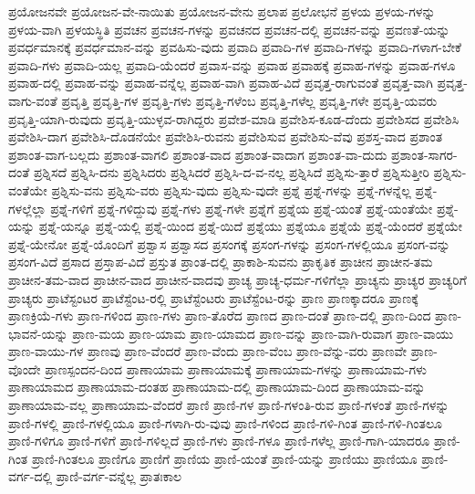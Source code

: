 {ಪ್ರಯೋಜನವೇ
ಪ್ರಯೋಜನ-ವೇ-ನಾಯಿತು
ಪ್ರಯೋಜನ-ವೇನು
ಪ್ರಲಾಪ
ಪ್ರಲೋಭನೆ
ಪ್ರಳಯ
ಪ್ರಳಯ-ಗಳನ್ನು
ಪ್ರಳಯ-ವಾಗಿ
ಪ್ರಳಯಸ್ಥಿತಿ
ಪ್ರವಚನ
ಪ್ರವಚನ-ಗಳನ್ನು
ಪ್ರವಚನದ
ಪ್ರವಚನ-ದಲ್ಲಿ
ಪ್ರವಚನ-ವನ್ನು
ಪ್ರವಣತೆ-ಯನ್ನು
ಪ್ರವರ್ಧಮಾನಕ್ಕೆ
ಪ್ರವರ್ಧಮಾನ-ವನ್ನು
ಪ್ರವಹಿಸು-ವುದು
ಪ್ರವಾದಿ
ಪ್ರವಾದಿ-ಗಳ
ಪ್ರವಾದಿ-ಗಳನ್ನು
ಪ್ರವಾದಿ-ಗಳಾಗ-ಬೇಕೆ
ಪ್ರವಾದಿ-ಗಳು
ಪ್ರವಾದಿ-ಯಲ್ಲ
ಪ್ರವಾದಿ-ಯೆಂದರೆ
ಪ್ರವಾಸ-ವನ್ನು
ಪ್ರವಾಹ
ಪ್ರವಾಹಕ್ಕೆ
ಪ್ರವಾಹ-ಗಳನ್ನು
ಪ್ರವಾಹ-ಗಳೂ
ಪ್ರವಾಹ-ದಲ್ಲಿ
ಪ್ರವಾಹ-ವನ್ನು
ಪ್ರವಾಹ-ವನ್ನೆಲ್ಲ
ಪ್ರವಾಹ-ವಾಗಿ
ಪ್ರವಾಹ-ವಿದೆ
ಪ್ರವೃತ್ತ-ರಾಗುವಂತೆ
ಪ್ರವೃತ್ತ-ವಾಗಿ
ಪ್ರವೃತ್ತ-ವಾಗು-ವಂತೆ
ಪ್ರವೃತ್ತಿ
ಪ್ರವೃತ್ತಿ-ಗಳ
ಪ್ರವೃತ್ತಿ-ಗಳು
ಪ್ರವೃತ್ತಿ-ಗಳೆಂಬ
ಪ್ರವೃತ್ತಿ-ಗಳೆಲ್ಲ
ಪ್ರವೃತ್ತಿ-ಗಳೇ
ಪ್ರವೃತ್ತಿ-ಯವರು
ಪ್ರವೃತ್ತಿ-ಯಾಗಿ-ರುವುದು
ಪ್ರವೃತ್ತಿ-ಯುಳ್ಳವ-ರಾಗಿದ್ದರು
ಪ್ರವೇಶ-ಮಾಡಿ
ಪ್ರವೇಶಿಸ-ಕೂಡ-ದೆಂದು
ಪ್ರವೇಶಿಸದ
ಪ್ರವೇಶಿಸಿ
ಪ್ರವೇಶಿಸಿ-ದಾಗ
ಪ್ರವೇಶಿಸಿ-ದೊಡನೆಯೇ
ಪ್ರವೇಶಿಸಿ-ರುವನು
ಪ್ರವೇಶಿಸುವ
ಪ್ರವೇಶಿಸು-ವೆವು
ಪ್ರಶಸ್ತ-ವಾದ
ಪ್ರಶಾಂತ
ಪ್ರಶಾಂತ-ವಾಗ-ಬಲ್ಲದು
ಪ್ರಶಾಂತ-ವಾಗಲಿ
ಪ್ರಶಾಂತ-ವಾದ
ಪ್ರಶಾಂತ-ವಾದಾಗ
ಪ್ರಶಾಂತ-ವಾ-ದುದು
ಪ್ರಶಾಂತ-ಸಾಗರ-ದಂತೆ
ಪ್ರಶ್ನಿಸದೆ
ಪ್ರಶ್ನಿಸಿ-ದನು
ಪ್ರಶ್ನಿಸಿದರು
ಪ್ರಶ್ನಿಸಿದರೆ
ಪ್ರಶ್ನಿಸಿ-ದ-ವ-ನಲ್ಲ
ಪ್ರಶ್ನಿಸಿದೆ
ಪ್ರಶ್ನಿಸು-ತ್ತಾರೆ
ಪ್ರಶ್ನಿಸುತ್ತೀರಿ
ಪ್ರಶ್ನಿಸು-ವಂತೆಯೇ
ಪ್ರಶ್ನಿಸು-ವನು
ಪ್ರಶ್ನಿಸು-ವರು
ಪ್ರಶ್ನಿಸು-ವುದು
ಪ್ರಶ್ನಿಸು-ವುದೇ
ಪ್ರಶ್ನೆ
ಪ್ರಶ್ನೆ-ಗಳನ್ನು
ಪ್ರಶ್ನೆ-ಗಳನ್ನೆಲ್ಲ
ಪ್ರಶ್ನೆ-ಗಳಲ್ಲೆಲ್ಲಾ
ಪ್ರಶ್ನೆ-ಗಳಿಗೆ
ಪ್ರಶ್ನೆ-ಗಳಿದ್ದುವು
ಪ್ರಶ್ನೆ-ಗಳು
ಪ್ರಶ್ನೆ-ಗಳೇ
ಪ್ರಶ್ನೆಗೆ
ಪ್ರಶ್ನೆಯ
ಪ್ರಶ್ನೆ-ಯಂತೆ
ಪ್ರಶ್ನೆ-ಯಂತೆಯೇ
ಪ್ರಶ್ನೆ-ಯನ್ನು
ಪ್ರಶ್ನೆ-ಯನ್ನೂ
ಪ್ರಶ್ನೆ-ಯಲ್ಲಿ
ಪ್ರಶ್ನೆ-ಯಿಂದ
ಪ್ರಶ್ನೆ-ಯಿದೆ
ಪ್ರಶ್ನೆಯು
ಪ್ರಶ್ನೆಯೂ
ಪ್ರಶ್ನೆಯೆ
ಪ್ರಶ್ನೆ-ಯೆಂದರೆ
ಪ್ರಶ್ನೆಯೇ
ಪ್ರಶ್ನೆ-ಯೇನೋ
ಪ್ರಶ್ನೆ-ಯೊಂದಿಗೆ
ಪ್ರಶ್ವಾಸ
ಪ್ರಶ್ವಾಸದ
ಪ್ರಸಂಗಕ್ಕೆ
ಪ್ರಸಂಗ-ಗಳನ್ನು
ಪ್ರಸಂಗ-ಗಳಲ್ಲಿಯೂ
ಪ್ರಸಂಗ-ವನ್ನು
ಪ್ರಸಂಗ-ವಿದೆ
ಪ್ರಸಾದ
ಪ್ರಸ್ತಾಪ-ವಿದೆ
ಪ್ರಸ್ತುತ
ಪ್ರಾಂತ-ದಲ್ಲಿ
ಪ್ರಾಕಾಶಿ-ಸುವನು
ಪ್ರಾಕೃತಿಕ
ಪ್ರಾಚೀನ
ಪ್ರಾಚೀನ-ತಮ
ಪ್ರಾಚೀನ-ತಮ-ವಾದ
ಪ್ರಾಚೀನ-ವಾದ
ಪ್ರಾಚೀನ-ವಾದವು
ಪ್ರಾಚ್ಯ
ಪ್ರಾಚ್ಯ-ಧರ್ಮ-ಗಳಿಗೆಲ್ಲಾ
ಪ್ರಾಚ್ಯನು
ಪ್ರಾಚ್ಯರ
ಪ್ರಾಚ್ಯರಿಗೆ
ಪ್ರಾಚ್ಯರು
ಪ್ರಾಟೆಸ್ಟಂಟರ
ಪ್ರಾಟೆಸ್ಟೆಂಟ-ರಲ್ಲಿ
ಪ್ರಾಟೆಸ್ಟೆಂಟರು
ಪ್ರಾಟೆಸ್ಟೆಂಟ-ರನ್ನು
ಪ್ರಾಣ
ಪ್ರಾಣಕ್ಕಾದರೂ
ಪ್ರಾಣಕ್ಕೆ
ಪ್ರಾಣಕ್ರಿಯೆ-ಗಳು
ಪ್ರಾಣ-ಗಳಿಂದ
ಪ್ರಾಣ-ಗಳು
ಪ್ರಾಣ-ತೊರೆದ
ಪ್ರಾಣದ
ಪ್ರಾಣ-ದಂತೆ
ಪ್ರಾಣ-ದಲ್ಲಿ
ಪ್ರಾಣ-ದಿಂದ
ಪ್ರಾಣ-ಭಾವನೆ-ಯನ್ನು
ಪ್ರಾಣ-ಮಯ
ಪ್ರಾಣ-ಯಾಮ
ಪ್ರಾಣ-ಯಾಮದ
ಪ್ರಾಣ-ವನ್ನು
ಪ್ರಾಣ-ವಾಗಿ-ರುವಾಗ
ಪ್ರಾಣ-ವಾಯು
ಪ್ರಾಣ-ವಾಯು-ಗಳ
ಪ್ರಾಣವು
ಪ್ರಾಣ-ವೆಂದರೆ
ಪ್ರಾಣ-ವೆಂದು
ಪ್ರಾಣ-ವೆಂಬ
ಪ್ರಾಣ-ವೆನ್ನು-ವರು
ಪ್ರಾಣವೇ
ಪ್ರಾಣ-ವೊಂದೇ
ಪ್ರಾಣಸ್ಪಂದನ-ದಿಂದ
ಪ್ರಾಣಾಯಾಮ
ಪ್ರಾಣಾಯಾಮಕ್ಕೆ
ಪ್ರಾಣಾಯಾಮ-ಗಳನ್ನು
ಪ್ರಾಣಾಯಾಮ-ಗಳು
ಪ್ರಾಣಾಯಾಮದ
ಪ್ರಾಣಾಯಾಮ-ದಂತಹ
ಪ್ರಾಣಾಯಾಮ-ದಲ್ಲಿ
ಪ್ರಾಣಾಯಾಮ-ದಿಂದ
ಪ್ರಾಣಾಯಾಮ-ವನ್ನು
ಪ್ರಾಣಾಯಾಮ-ವಲ್ಲ
ಪ್ರಾಣಾಯಾಮ-ವೆಂದರೆ
ಪ್ರಾಣಿ
ಪ್ರಾಣಿ-ಗಳ
ಪ್ರಾಣಿ-ಗಳಂತಿ-ರುವ
ಪ್ರಾಣಿ-ಗಳಂತೆ
ಪ್ರಾಣಿ-ಗಳನ್ನು
ಪ್ರಾಣಿ-ಗಳಲ್ಲಿ
ಪ್ರಾಣಿ-ಗಳಲ್ಲಿಯೂ
ಪ್ರಾಣಿ-ಗಳಾಗಿ-ರು-ವುವು
ಪ್ರಾಣಿ-ಗಳಿಂದ
ಪ್ರಾಣಿ-ಗಳಿ-ಗಿಂತ
ಪ್ರಾಣಿ-ಗಳಿ-ಗಿಂತಲೂ
ಪ್ರಾಣಿ-ಗಳಿಗೂ
ಪ್ರಾಣಿ-ಗಳಿಗೆ
ಪ್ರಾಣಿ-ಗಳಿಲ್ಲದೆ
ಪ್ರಾಣಿ-ಗಳು
ಪ್ರಾಣಿ-ಗಳೂ
ಪ್ರಾಣಿ-ಗಳೆಲ್ಲ
ಪ್ರಾಣಿ-ಗಾಗಿ-ಯಾದರೂ
ಪ್ರಾಣಿ-ಗಿಂತ
ಪ್ರಾಣಿ-ಗಿಂತಲೂ
ಪ್ರಾಣಿಗೂ
ಪ್ರಾಣಿಗೆ
ಪ್ರಾಣಿಯ
ಪ್ರಾಣಿ-ಯಂತೆ
ಪ್ರಾಣಿ-ಯನ್ನು
ಪ್ರಾಣಿಯು
ಪ್ರಾಣಿಯೂ
ಪ್ರಾಣಿ-ವರ್ಗ-ದಲ್ಲಿ
ಪ್ರಾಣಿ-ವರ್ಗ-ವನ್ನೆಲ್ಲ
ಪ್ರಾತಃಕಾಲ
}
